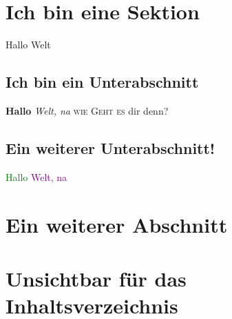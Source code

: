\documentclass{article}
\begin{document}
\tableofcontents

\section{Ich bin eine Sektion}
Hallo Welt

\subsection{Ich bin ein Unterabschnitt}
\textbf{Hallo} \textit{Welt, na} \textsc{wie Geht es} dir denn?

\subsection[Im Inhaltsverzeichnis heiße ich genau so!]{Ein weiterer Unterabschnitt!}
\textcolor{green}{Hallo} \textcolor{purple}{Welt, na}

\section[Peter]{Ein weiterer Abschnitt}

\section*{Unsichtbar für das Inhaltsverzeichnis}
\end{document}
